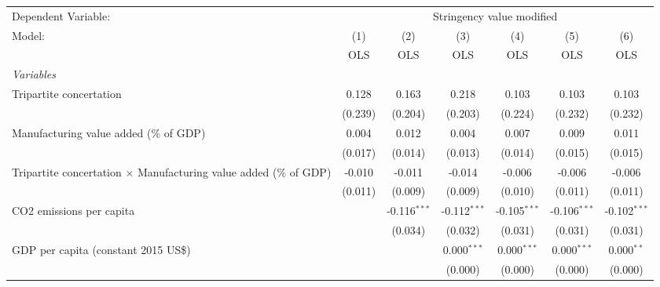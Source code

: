 
\begingroup
\centering
\begin{tabular}{lcccccc}
   \toprule
   Dependent Variable: & \multicolumn{6}{c}{Stringency value modified}\\
   Model:                                                                   & (1)     & (2)            & (3)            & (4)            & (5)            & (6)\\  
                                                                            &  OLS    & OLS            & OLS            & OLS            & OLS            & OLS\\  
   \midrule
   \emph{Variables}\\
   Tripartite concertation                                                  & 0.128   & 0.163          & 0.218          & 0.103          & 0.103          & 0.103\\   
                                                                            & (0.239) & (0.204)        & (0.203)        & (0.224)        & (0.232)        & (0.232)\\   
   Manufacturing value added (\% of GDP)                                    & 0.004   & 0.012          & 0.004          & 0.007          & 0.009          & 0.011\\   
                                                                            & (0.017) & (0.014)        & (0.013)        & (0.014)        & (0.015)        & (0.015)\\   
   Tripartite concertation $\times$ Manufacturing value added (\% of GDP)   & -0.010  & -0.011         & -0.014         & -0.006         & -0.006         & -0.006\\   
                                                                            & (0.011) & (0.009)        & (0.009)        & (0.010)        & (0.011)        & (0.011)\\   
   CO2 emissions per capita                                                 &         & -0.116$^{***}$ & -0.112$^{***}$ & -0.105$^{***}$ & -0.106$^{***}$ & -0.102$^{***}$\\   
                                                                            &         & (0.034)        & (0.032)        & (0.031)        & (0.031)        & (0.031)\\   
   GDP per capita (constant 2015 US\$)                                      &         &                & 0.000$^{***}$  & 0.000$^{***}$  & 0.000$^{***}$  & 0.000$^{**}$\\   
                                                                            &         &                & (0.000)        & (0.000)        & (0.000)        & (0.000)\\   

\end{tabular}
